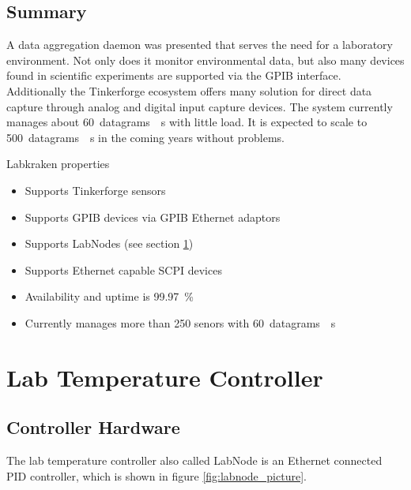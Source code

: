 \subsection{Summary}
A data aggregation daemon was presented that serves the need for a laboratory environment. Not only does it monitor environmental data, but also many devices found in scientific experiments are supported via the GPIB interface. Additionally the Tinkerforge ecosystem offers many solution for direct data capture through analog and digital input capture devices. The system currently manages about \qty{60}{datagrams \per \second} with little load. It is expected to scale to \qty{500}{datagrams \per \second} in the coming years without problems.
\begin{center}
    \begin{deviceProperties}[label={lst:labkraken_summary}]{Labkraken properties}
    \begin{itemize}
        \item Supports Tinkerforge sensors
        \item Supports GPIB devices via GPIB Ethernet adaptors
        \item Supports LabNodes (see section \ref{sec:lab_temp_control})
        \item Supports Ethernet capable SCPI devices
        \item Availability and uptime is \qty{99.97}{\percent}
        \item Currently manages more than 250 senors with \qty{60}{datagrams \per \second}
    \end{itemize}
    \end{deviceProperties}
\end{center}

\clearpage
\section{Lab Temperature Controller}%
\label{sec:lab_temp_control}

\subsection{Controller Hardware}
The lab temperature controller also called LabNode is an Ethernet connected PID controller, which is shown in figure \ref{fig:labnode_picture}.

